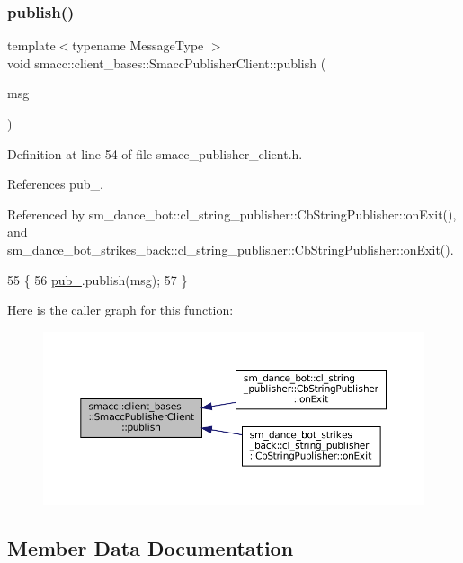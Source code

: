 \subsubsection{\texorpdfstring{publish()}{publish()}}
{\footnotesize\ttfamily template$<$typename Message\+Type $>$ \\
void smacc\+::client\+\_\+bases\+::\+Smacc\+Publisher\+Client\+::publish (\begin{DoxyParamCaption}\item[{const Message\+Type \&}]{msg }\end{DoxyParamCaption})\hspace{0.3cm}{\ttfamily [inline]}}



Definition at line 54 of file smacc\+\_\+publisher\+\_\+client.\+h.



References pub\+\_\+.



Referenced by sm\+\_\+dance\+\_\+bot\+::cl\+\_\+string\+\_\+publisher\+::\+Cb\+String\+Publisher\+::on\+Exit(), and sm\+\_\+dance\+\_\+bot\+\_\+strikes\+\_\+back\+::cl\+\_\+string\+\_\+publisher\+::\+Cb\+String\+Publisher\+::on\+Exit().


\begin{DoxyCode}
55   \{
56     \hyperlink{classsmacc_1_1client__bases_1_1SmaccPublisherClient_af39f498e73e8f956aae312065a4fd093}{pub\_}.publish(msg);
57   \}
\end{DoxyCode}
Here is the caller graph for this function\+:
\nopagebreak
\begin{figure}[H]
\begin{center}
\leavevmode
\includegraphics[width=350pt]{classsmacc_1_1client__bases_1_1SmaccPublisherClient_a083abb0f5c0f587f3381a58fe1fe3669_icgraph}
\end{center}
\end{figure}


\subsection{Member Data Documentation}
\mbox{\label{classsmacc_1_1client__bases_1_1SmaccPublisherClient_acb2fbd8b9797ce286d9ecc0419e2cc55}} 
